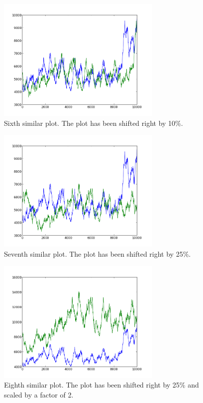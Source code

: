 \begin{figure}[h!]
    \centering
    \includegraphics[width=0.7\textwidth]{images/mutant_6.png}
    \caption{Sixth similar plot.  The plot has been shifted right by 10\%.}
    \label{fig:mutant_6}
\end{figure}

\begin{figure}[h!]
    \centering
    \includegraphics[width=0.7\textwidth]{images/mutant_7.png}
    \caption{Seventh similar plot.  The plot has been shifted right by 25\%.}
    \label{fig:mutant_7}
\end{figure}

\begin{figure}[h!]
    \centering
    \includegraphics[width=0.7\textwidth]{images/mutant_8.png}
    \caption{Eighth similar plot.  The plot has been shifted right by 25\% and scaled by a factor of 2.}
    \label{fig:mutant_8}
\end{figure}

